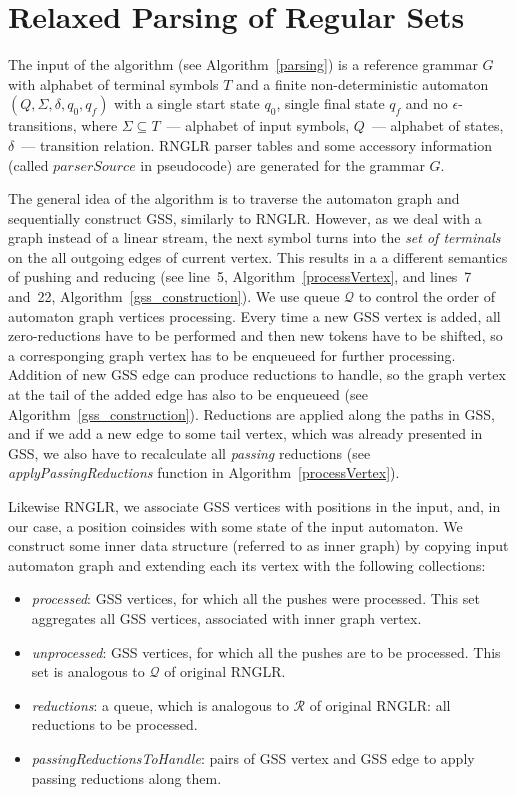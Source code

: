 \section{Relaxed Parsing of Regular Sets}

The input of the algorithm (see Algorithm~\ref{parsing}) is a reference grammar $G$ with alphabet of terminal symbols $T$ 
and a finite non-deterministic automaton $(Q, \Sigma, \delta, q_0, q_f)$ with a single start state $q_0$, single final state $q_f$ 
and no $\epsilon$-transitions, where $\Sigma \subseteq T$~--- alphabet of input symbols, $Q$~--- alphabet of states, 
$\delta$~--- transition relation. RNGLR parser tables and some accessory information (called $parserSource$ in pseudocode) 
are generated for the grammar $G$. 

The general idea of the algorithm is to traverse the automaton graph and sequentially construct GSS, similarly to RNGLR.
However, as we deal with a graph instead of a linear stream, the next symbol turns into the \emph{set of terminals} on the 
all outgoing edges of current vertex. This results in a a different semantics of pushing and reducing (see line~5, 
Algorithm~\ref{processVertex}, and lines~7 and~22, Algorithm~\ref{gss_construction}). We use queue $\mathcal Q$ to control the 
order of automaton graph vertices processing. Every time a new GSS vertex is added, all zero-reductions have to be performed 
and then new tokens have to be shifted, so a corresponging graph vertex has to be enqueueed for further processing. 
Addition of new GSS edge can produce reductions to handle, so the graph vertex at the tail of the added edge has 
also to be enqueueed (see Algorithm~\ref{gss_construction}). Reductions are applied along the paths in GSS, and if we add
a new edge to some tail vertex, which was already presented in GSS, we also have to recalculate all \emph{passing} reductions
(see \emph{applyPassingReductions} function in Algorithm~\ref{processVertex}).

Likewise RNGLR, we associate GSS vertices with positions in the input,
and, in our case, a position coinsides with some state of the input automaton. We construct some
inner data structure (referred to as inner graph) by copying input automaton graph and 
extending each its vertex with the following collections: 

\begin{itemize}
  \item \emph{processed}: GSS vertices, for which all the pushes were processed. 
   This set aggregates all GSS vertices, associated with inner graph vertex.
  \item \emph{unprocessed}: GSS vertices, for which all the pushes are to be processed. 
   This set is analogous to $\mathcal{Q}$ of original RNGLR.
  \item \emph{reductions}: a queue, which is analogous to $\mathcal{R}$ of original RNGLR: 
   all reductions to be processed.
  \item \emph{passingReductionsToHandle}: pairs of GSS vertex and GSS edge to apply 
   passing reductions along them.
\end{itemize}

